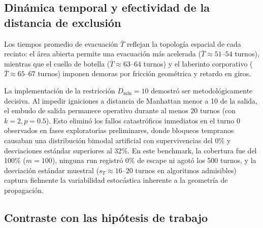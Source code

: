 \documentclass[11pt,letterpaper]{article}
\begin{document}
\subsection{Dinámica temporal y efectividad de la distancia de exclusión}
Los tiempos promedio de evacuación $\overline{T}$ reflejan la topología espacial de cada recinto: el área abierta permite una evacuación más acelerada ($\overline{T} \approx 51$--$54$ turnos), mientras que el cuello de botella ($\overline{T} \approx 63$--$64$ turnos) y el laberinto corporativo ($\overline{T} \approx 65$--$67$ turnos) imponen demoras por fricción geométrica y retardo en giros.

La implementación de la restricción $D_{\min}=10$ demostró ser metodológicamente decisiva. Al impedir igniciones a distancia de Manhattan menor a 10 de la salida, el embudo de salida permanece operativo durante al menos 20 turnos (con $k=2, p=0.5$). Esto eliminó los fallos catastróficos inmediatos en el turno 0 observados en fases exploratorias preliminares, donde bloqueos tempranos causaban una distribución bimodal artificial con supervivencias del 0\% y desviaciones estándar superiores al 32\%. En este benchmark, la cobertura fue del 100\% ($m=100$), ninguna run registró 0\% de escape ni agotó los 500 turnos, y la desviación estándar muestral ($s_T \approx 16$--$20$ turnos en algoritmos admisibles) captura fielmente la variabilidad estocástica inherente a la geometría de propagación.

\subsection{Contraste con las hipótesis de trabajo}
\end{document}
